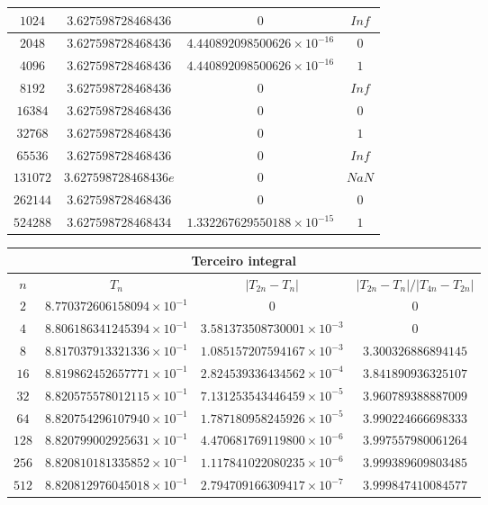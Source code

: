 \documentclass[a4paper,10pt]{extarticle}
\begin{document}
\begin{enumerate}
\begin{enumerate}
\begin{center}
{\begin{tabular}{|c|c|c|c|}
\hline
$1024$&$3.627598728468436$&$0$&$Inf$\\
\hline
$2048$&$3.627598728468436$&$4.440892098500626\times 10^{-16}$&$0$\\
\hline
$4096$&$3.627598728468436$&$4.440892098500626\times 10^{-16}$&$1$\\
\hline
$8192$&$3.627598728468436$&$0$&$Inf$\\
\hline
$16384$&$3.627598728468436$&$0$&$0$\\
\hline
$32768$&$3.627598728468436$&$0$&$1$\\
\hline
$65536$&$3.627598728468436$&$0$&$Inf$\\
\hline
$131072$&$3.627598728468436e$&$0$&$NaN$\\
\hline
$262144$&$3.627598728468436$&$0$&$0$\\
\hline
$524288$&$3.627598728468434$&$1.332267629550188\times 10^{-15}$&$1$\\
\hline
\end{tabular}}
\end{center}
\begin{center}
{\small\begin{tabular}{|c|c|c|c|}
\hline
\multicolumn{4}{|c|}{Terceiro integral}\\
\hline
 $n$&$T_n$&$|T_{2n}-T_n|$&$|T_{2n}-T_n|/|T_{4n}-T_{2n}|$\\
\hline
 $2$&$8.770372606158094\times 10^{-1}$&$0$&$0$\\
\hline
 $4$&$8.806186341245394\times 10^{-1}$&$3.581373508730001\times 10^{-3}$&$0$\\
\hline
 $8$&$8.817037913321336\times 10^{-1}$&$1.085157207594167\times 10^{-3}$&$3.300326886894145$\\
\hline
$16$&$8.819862452657771\times 10^{-1}$&$2.824539336434562\times 10^{-4}$&$3.841890936325107$\\
\hline
$32$&$8.820575578012115\times 10^{-1}$&$7.131253543446459\times 10^{-5}$&$3.960789388887009$\\
\hline
$64$&$8.820754296107940\times 10^{-1}$&$1.787180958245926\times 10^{-5}$&$3.990224666698333$\\
\hline
$128$&$8.820799002925631\times 10^{-1}$&$4.470681769119800\times 10^{-6}$&$3.997557980061264$\\
\hline
$256$&$8.820810181335852\times 10^{-1}$&$1.117841022080235\times 10^{-6}$&$3.999389609803485$\\
\hline
$512$&$8.820812976045018\times 10^{-1}$&$2.794709166309417\times 10^{-7}$&$3.999847410084577$\\

\end{tabular}}
\end{center}
\end{enumerate}
\end{enumerate}
\end{document}
